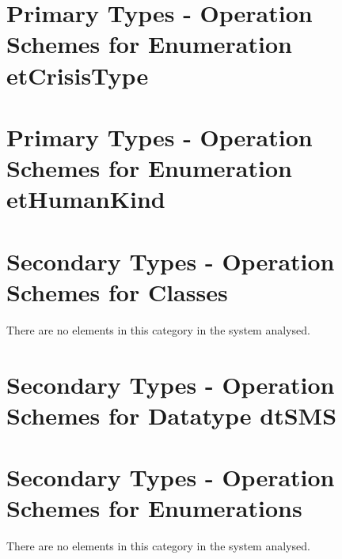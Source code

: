 \section{Primary Types - Operation Schemes for Enumeration etCrisisType} 
\label{OM-CM-PTEnumType-etCrisisType}

\section{Primary Types - Operation Schemes for Enumeration etHumanKind} 
\label{OM-CM-PTEnumType-etHumanKind}






\section{Secondary Types - Operation Schemes for Classes}
There are no elements in this category in the system analysed.






\section{Secondary Types - Operation Schemes for Datatype dtSMS} 
\label{OM-CM-STDataType-dtSMS}



\section{Secondary Types - Operation Schemes for Enumerations}
There are no elements in this category in the system analysed.


